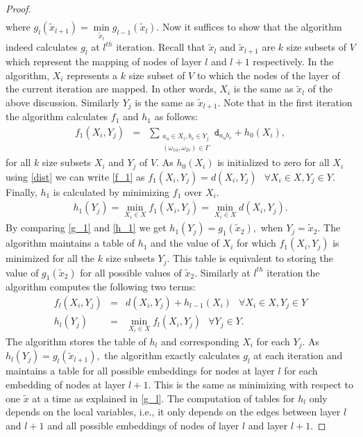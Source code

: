\documentclass[journal]{IEEEtran}
\newcommand{\netnodes}{V}
\newcommand{\compedges}{\Gamma}
\newcommand{\distance}{\mathtt{d}} \newcommand{\edgewt}{\mathtt{W}} \newcommand{\processingwt}{\mathtt{P}}
\begin{document}
\begin{proof}
\begin{eqnarray}
  \end{eqnarray}
where $g_l(\tilde{x}_{l+1}) = \min\limits_{\tilde{x}_l}
  g_{l-1}(\tilde{x}_l).$ Now it suffices to show that the algorithm
  indeed calculates $g_l$ at $l^{th}$ iteration. Recall that
  $\tilde{x}_l$ and $\tilde{x}_{l+1}$ are $k$ size subsets of
  $\netnodes$ which represent the mapping of nodes of layer $l$ and
  $l+1$ respectively. In the algorithm, $X_i$ represents a $k$ size
  subset of $\netnodes$ to which the nodes of the layer of the current
  iteration are mapped. In other words, $X_i$ is the same as
  $\tilde{x}_l$ of the above discussion. Similarly $Y_j$ is the same
  as $\tilde{x}_{l+1}.$ Note that in the first iteration the algorithm
  calculates $f_1$ and $h_1$ as follows:
\begin{eqnarray}
    f_1(X_i,Y_j) &=& \sum\limits_{\substack{a_u \in X_i, b_v \in Y_j \\
        (\omega_{1u},\omega_{2v}) \in \compedges}} \distance_{a_ub_v} +
    h_0(X_i),  \label{f_1}  
\end{eqnarray}
for all $k$ size subsets $X_i$ and $Y_j$ of $\netnodes.$ As
  $h_0(X_i)$ is initialized to zero for all $X_i$ using \eqref{dist}
  we can write \eqref{f_1} as  $f_1(X_i,Y_j) = d(X_i,Y_j) \; \ \ \forall X_i \in X, Y_j \in Y.$
  Finally, $h_1$ is calculated by minimizing $f_1$ over $X_i.$
  \begin{eqnarray}
    h_1(Y_j) = \min\limits_{X_i \in X} f_1(X_i,Y_j) = \min\limits_{X_i
    \in X} d(X_i,Y_j). \label{h_1}
  \end{eqnarray} 
By comparing \eqref{g_1} and \eqref{h_1} we get $h_1(Y_j) =
  g_1(\tilde{x}_2),$ when $Y_j =\tilde{x}_2.$ The algorithm maintains
  a table of $h_1$ and the value of $X_i$ for which $f_1(X_i,Y_j)$ is
  minimized for all the $k$ size subsets $Y_j.$ This table is
  equivalent to storing the value of $g_1(\tilde{x}_2)$ for all
  possible values of $\tilde{x}_2.$ Similarly at $l^{th}$ iteration
  the algorithm computes the following two terms:
\begin{eqnarray*}
    f_l(X_i,Y_j) &=& d(X_i,Y_j) + h_{l-1}(X_i) \; \ \ \forall X_i \in X, Y_j \in Y \\
    h_l(Y_j) &=& \min\limits_{X_i \in X} f_l(X_i,Y_j) \; \ \ \forall Y_j \in Y.
  \end{eqnarray*}  
The algorithm stores the table of $h_l$ and corresponding $X_i$ for
  each $Y_j.$ As $h_l(Y_j) = g_l(\tilde{x}_{l+1}),$
  the algorithm exactly calculates $g_l$ at each iteration and
  maintains a table for all possible embeddings for nodes at layer $l$
  for each embedding of nodes at layer $l+1.$ This is the same as
  minimizing with respect to one $\tilde{x}$ at a time as explained in
  \eqref{g_l}. The computation of tables for $h_l$ only depends on the
  local variables, i.e., it only depends on the edges between layer
  $l$ and $l+1$ and all possible embeddings of nodes of layer $l$ and
  layer $l+1.$


\end{proof}
\end{document}
